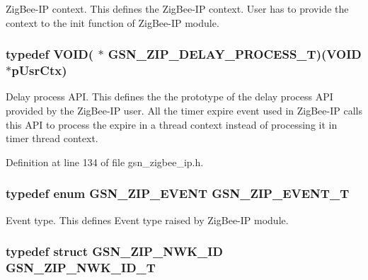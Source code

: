 ZigBee-\/IP context. This defines the ZigBee-\/IP context. User has to provide the context to the init function of ZigBee-\/IP module. 

\hypertarget{a00618_a7f63a0d767866fd213452687d2666c67}{
\subsubsection[{GSN\_\-ZIP\_\-DELAY\_\-PROCESS\_\-T}]{\setlength{\rightskip}{0pt plus 5cm}typedef VOID( $\ast$ {\bf GSN\_\-ZIP\_\-DELAY\_\-PROCESS\_\-T})(VOID $\ast$pUsrCtx)}}
\label{a00618_a7f63a0d767866fd213452687d2666c67}


Delay process API. This defines the the prototype of the delay process API provided by the ZigBee-\/IP user. All the timer expire event used in ZigBee-\/IP calls this API to process the expire in a thread context instead of processing it in timer thread context. 



Definition at line 134 of file gsn\_\-zigbee\_\-ip.h.

\hypertarget{a00618_ac587cf0eef9961ea24592b3352992346}{
\subsubsection[{GSN\_\-ZIP\_\-EVENT\_\-T}]{\setlength{\rightskip}{0pt plus 5cm}typedef enum {\bf GSN\_\-ZIP\_\-EVENT} {\bf GSN\_\-ZIP\_\-EVENT\_\-T}}}
\label{a00618_ac587cf0eef9961ea24592b3352992346}


Event type. This defines Event type raised by ZigBee-\/IP module. 

\hypertarget{a00618_ab9aa63483741b5262a1f9a8381d1117b}{
\subsubsection[{GSN\_\-ZIP\_\-NWK\_\-ID\_\-T}]{\setlength{\rightskip}{0pt plus 5cm}typedef struct {\bf GSN\_\-ZIP\_\-NWK\_\-ID} {\bf GSN\_\-ZIP\_\-NWK\_\-ID\_\-T}}}
\label{a00618_ab9aa63483741b5262a1f9a8381d1117b}



